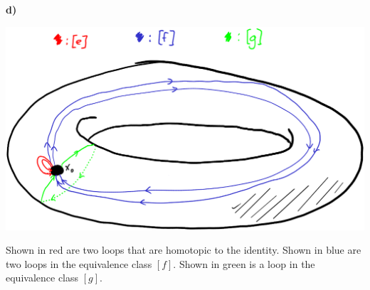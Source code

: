 \documentclass[12pt]{report}
\begin{document}
\medskip\noindent\textbf{d)}

\begin{center}\includegraphics[scale=.5]{4.png}\end{center}
    Shown in red are two loops that are homotopic to the identity.
    Shown in blue are two loops in the equivalence class $[f]$.
    Shown in green is a loop in the equivalence class $[g]$.
\end{document}
